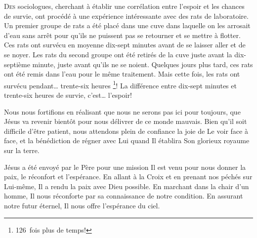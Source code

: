 \dvrule







\lettrine{D}{es} sociologues, cherchant à établir une corrélation
 entre l'espoir et les chances de survie,
 ont procédé à une expérience intéressante
 avec des rats de laboratoire.
 Un premier groupe de rats a été placé dans une cuve
 dans laquelle on les arrosait d'eau sans arrêt
 pour qu'ils ne puissent pas se retourner et se mettre à flotter.
 Ces rats ont survécu en moyenne dix-sept minutes
 avant de se laisser aller et de se noyer.
 Les rats du second groupe ont été retirés de la cuve
 juste avant la dix-septième minute, juste avant qu'ils ne se noient.
 Quelques jours plus tard, ces rats ont été remis dans l'eau
 pour le même traitement.
 Mais cette fois, les rats ont survécu pendant\dots{} trente-six heures \footnote{126~fois plus de temps!}!
 La différence entre dix-sept minutes et trente-six heures de survie,
 c'est\dots{} l'espoir!


Nous nous fortifions en réalisant que nous ne serons pas ici pour toujours,
 que Jésus va revenir bientôt pour nous délivrer de ce monde mauvais.
 Bien qu'il soit difficile d'être patient, nous attendons plein de confiance
 la joie de Le voir face à face, et la bénédiction de régner avec Lui
 quand Il établira Son glorieux royaume sur la terre.

Jésus a été envoyé par le Père pour une mission\frcolon{}
 Il est venu pour nous donner la paix, le réconfort et l'espérance.
 En allant à la Croix et en prenant nos péchés sur Lui-même,
 Il a rendu la paix avec Dieu possible.
 En marchant dans la chair d'un homme,
 Il nous réconforte par sa connaissance de notre condition.
 En assurant notre futur éternel, Il nous offre l'espérance du ciel.

